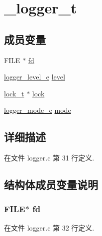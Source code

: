 \hypertarget{struct__logger__t}{}\section{\+\_\+logger\+\_\+t}
\label{struct__logger__t}
\subsection*{成员变量}
\begin{DoxyCompactItemize}
\item 
F\+I\+L\+E $\ast$ \hyperlink{struct__logger__t_a600b792d6d2ff2e71096dfa60d97a3b0}{fd}
\item 
\hyperlink{config_8h_afe883c56a5fd8d7794a3dd36780ed9d0}{logger\+\_\+level\+\_\+e} \hyperlink{struct__logger__t_a1187947f1946be67ece2cfc21e72a6cb}{level}
\item 
\hyperlink{config_8h_ad3e00e0eb0c79dfd77ff2ff833f49c7d}{lock\+\_\+t} $\ast$ \hyperlink{struct__logger__t_abf14bc3bc3eb5e72e92811fcc36b5063}{lock}
\item 
\hyperlink{config_8h_aa72cd8c306f50bee7c64e1daa1c1f3f4}{logger\+\_\+mode\+\_\+e} \hyperlink{struct__logger__t_ad4dba8d44f147173e40f1f5f753cbf3b}{mode}
\end{DoxyCompactItemize}


\subsection{详细描述}


在文件 logger.\+c 第 31 行定义.



\subsection{结构体成员变量说明}
\hypertarget{struct__logger__t_a600b792d6d2ff2e71096dfa60d97a3b0}{}
\subsubsection[{fd}]{\setlength{\rightskip}{0pt plus 5cm}F\+I\+L\+E$\ast$ fd}\label{struct__logger__t_a600b792d6d2ff2e71096dfa60d97a3b0}


在文件 logger.\+c 第 32 行定义.

\hypertarget{struct__logger__t_a1187947f1946be67ece2cfc21e72a6cb}{}
